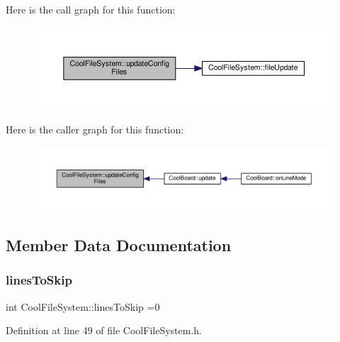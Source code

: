 Here is the call graph for this function\+:\nopagebreak
\begin{figure}[H]
\begin{center}
\leavevmode
\includegraphics[width=350pt]{db/d0c/class_cool_file_system_adfa8e2e80641ae6f0cceabd348a9b841_cgraph}
\end{center}
\end{figure}
Here is the caller graph for this function\+:\nopagebreak
\begin{figure}[H]
\begin{center}
\leavevmode
\includegraphics[width=350pt]{db/d0c/class_cool_file_system_adfa8e2e80641ae6f0cceabd348a9b841_icgraph}
\end{center}
\end{figure}


\subsection{Member Data Documentation}
\mbox{\label{class_cool_file_system_a84fdb6057e534b395512463daa28ea3c}} 
\subsubsection{\texorpdfstring{lines\+To\+Skip}{linesToSkip}}
{\footnotesize\ttfamily int Cool\+File\+System\+::lines\+To\+Skip =0\hspace{0.3cm}{\ttfamily [private]}}



Definition at line 49 of file Cool\+File\+System.\+h.

\mbox{\label{class_cool_file_system_ad9f5b739a32100f5f21270c3d9ee2b1d}} 
